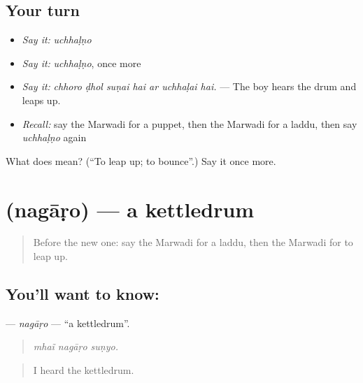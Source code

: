 \subsection*{Your turn}
\begin{itemize}
\raggedright
  \item \emph{Say it:} \emph{uchhaḷṇo}
  \item \emph{Say it:} \emph{uchhaḷṇo}, once more
  \item \emph{Say it:} \emph{chhoro ḍhol suṇai hai ar uchhaḷai hai.} — The boy hears the drum and leaps up.
  \item \emph{Recall:} say the Marwadi for a puppet, then the Marwadi for a laddu, then say \emph{uchhaḷṇo} again
\end{itemize}

\begin{tcolorbox}[breakable,colback=teal!4,colframe=teal!35!black,title={Before you move on}]
What does  mean? (\textquotedblleft{}To leap up; to bounce\textquotedblright{}.) Say it once more.
\end{tcolorbox}
\section[\texorpdfstring{\mw{नगाड़ो} (nagāṛo)}{नगाड़ो (nagāṛo)}]{ (nagāṛo) — a kettledrum}

\label{lesson:MW-C224-nagaro}



\begin{quote}
Before the new one: say the Marwadi for a laddu, then the Marwadi for to leap up.
\end{quote}

\subsection*{You'll want to know: }
\textbf{} — \emph{nagāṛo} — \textquotedblleft{}a kettledrum\textquotedblright{}.

\begin{quote}
  
\end{quote}

\begin{quote}
\emph{mhaĩ nagāṛo suṇyo.}
\end{quote}

\begin{quote}
I heard the kettledrum.
\end{quote}

